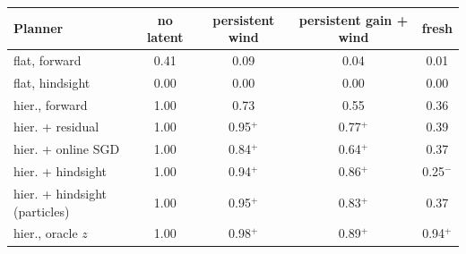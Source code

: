 \begin{tabular}{lcccc}
\toprule
Planner & no latent & persistent wind & persistent gain + wind & fresh \\
\midrule
flat, forward & 0.41 & 0.09 & 0.04 & 0.01 \\
flat, hindsight & 0.00 & 0.00 & 0.00 & 0.00 \\
hier., forward & 1.00 & 0.73 & 0.55 & 0.36 \\
hier. + residual & 1.00 & 0.95$^{+}$ & 0.77$^{+}$ & 0.39 \\
hier. + online SGD & 1.00 & 0.84$^{+}$ & 0.64$^{+}$ & 0.37 \\
hier. + hindsight & 1.00 & 0.94$^{+}$ & 0.86$^{+}$ & 0.25$^{-}$ \\
hier. + hindsight (particles) & 1.00 & 0.95$^{+}$ & 0.83$^{+}$ & 0.37 \\
hier., oracle $z$ & 1.00 & 0.98$^{+}$ & 0.89$^{+}$ & 0.94$^{+}$ \\
\bottomrule
\end{tabular}
